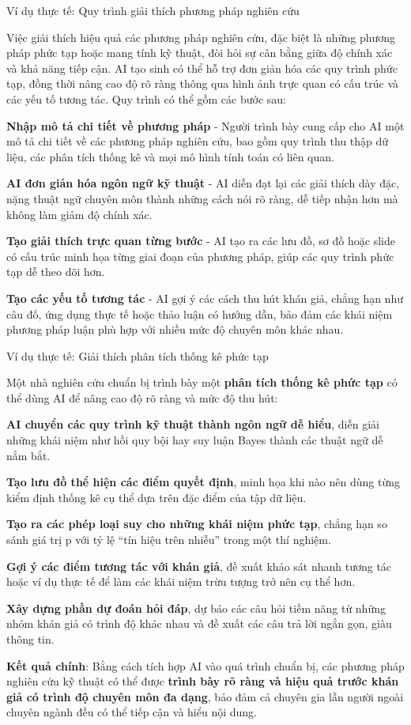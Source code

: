 \begin{examplebox}{Ví dụ thực tế: Quy trình giải thích phương pháp nghiên cứu}

Việc giải thích hiệu quả các phương pháp nghiên cứu, đặc biệt là những phương pháp phức tạp hoặc mang tính kỹ thuật, đòi hỏi sự cân bằng giữa độ chính xác và khả năng tiếp cận. AI tạo sinh có thể hỗ trợ đơn giản hóa các quy trình phức tạp, đồng thời nâng cao độ rõ ràng thông qua hình ảnh trực quan có cấu trúc và các yếu tố tương tác. Quy trình có thể gồm các bước sau:

\textbf{Nhập mô tả chi tiết về phương pháp} - Người trình bày cung cấp cho AI một mô tả chi tiết về các phương pháp nghiên cứu, bao gồm quy trình thu thập dữ liệu, các phân tích thống kê và mọi mô hình tính toán có liên quan.

\textbf{AI đơn giản hóa ngôn ngữ kỹ thuật} - AI diễn đạt lại các giải thích dày đặc, nặng thuật ngữ chuyên môn thành những cách nói rõ ràng, dễ tiếp nhận hơn mà không làm giảm độ chính xác.

\textbf{Tạo giải thích trực quan từng bước} - AI tạo ra các lưu đồ, sơ đồ hoặc slide có cấu trúc minh họa từng giai đoạn của phương pháp, giúp các quy trình phức tạp dễ theo dõi hơn.

\textbf{Tạo các yếu tố tương tác} - AI gợi ý các cách thu hút khán giả, chẳng hạn như câu đố, ứng dụng thực tế hoặc thảo luận có hướng dẫn, bảo đảm các khái niệm phương pháp luận phù hợp với nhiều mức độ chuyên môn khác nhau.

\end{examplebox}

\begin{examplebox}{Ví dụ thực tế: Giải thích phân tích thống kê phức tạp}

Một nhà nghiên cứu chuẩn bị trình bày một \textbf{phân tích thống kê phức tạp} có thể dùng AI để nâng cao độ rõ ràng và mức độ thu hút:

\textbf{AI chuyển các quy trình kỹ thuật thành ngôn ngữ dễ hiểu}, diễn giải những khái niệm như hồi quy bội hay suy luận Bayes thành các thuật ngữ dễ nắm bắt.

\textbf{Tạo lưu đồ thể hiện các điểm quyết định}, minh họa khi nào nên dùng từng kiểm định thống kê cụ thể dựa trên đặc điểm của tập dữ liệu.

\textbf{Tạo ra các phép loại suy cho những khái niệm phức tạp}, chẳng hạn so sánh giá trị p với tỷ lệ ``tín hiệu trên nhiễu'' trong một thí nghiệm.

\textbf{Gợi ý các điểm tương tác với khán giả}, đề xuất khảo sát nhanh tương tác hoặc ví dụ thực tế để làm các khái niệm trừu tượng trở nên cụ thể hơn.

\textbf{Xây dựng phần dự đoán hỏi đáp}, dự báo các câu hỏi tiềm năng từ những nhóm khán giả có trình độ khác nhau và đề xuất các câu trả lời ngắn gọn, giàu thông tin.

\textbf{Kết quả chính}: Bằng cách tích hợp AI vào quá trình chuẩn bị, các phương pháp nghiên cứu kỹ thuật có thể được \textbf{trình bày rõ ràng và hiệu quả trước khán giả có trình độ chuyên môn đa dạng}, bảo đảm cả chuyên gia lẫn người ngoài chuyên ngành đều có thể tiếp cận và hiểu nội dung.

\end{examplebox}

